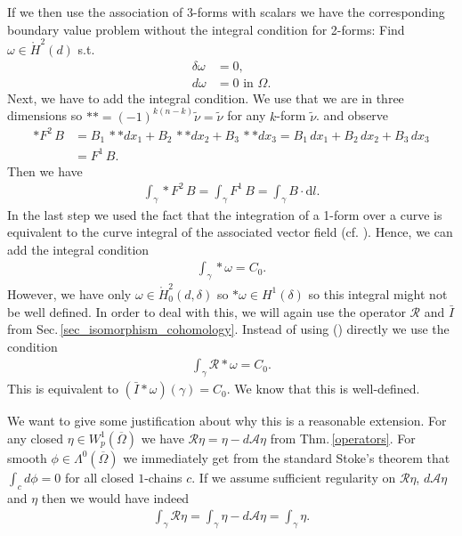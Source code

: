 \documentclass[12pt,a4paper]{article}
\theoremstyle{definition}
\newcommand{\aop}{\mathscr{A}}
\newcommand{\omegabar}{\overline{\Omega}}
\newcommand{\rop}{\mathscr{R}} %
\begin{document}
If we then use the association of
3-forms with scalars we have the corresponding boundary value problem without
the integral condition for 
2-forms: Find $\omega \in \mathring{H}^2(d)$ s.t.
\begin{align}
    \delta \omega &= 0, \\ 
    d\omega  &= 0 \text{ in } \Omega.
\end{align}
Next, we have to add the integral condition. 
We use that we are in three dimensions so
$**=(-1)^{k(n-k)}\tilde{\nu} = \tilde{\nu}$ \cite[p.66]{arnold} for any
$k$-form $\tilde{\nu}$.
and observe
\begin{align*}
    *F^2 \, B  &= B_1 \, **dx_1 + B_2 \, **dx_2 + B_3\, **dx_3 
        = B_1 \, dx_1 + B_2 \, dx_2 + B_3\, dx_3\\ 
    &= F^1 \, B.
\end{align*}
Then we have 
\begin{align*}
    \int_\gamma * F^2\, B = \int_\gamma F   ^1\, B = \int_\gamma B \cdot \text{d}l.
\end{align*}
In the last step we used the fact that the integration of a 1-form over a
curve is equivalent to the curve integral of the associated vector field
(cf. \cite[Sec. 6.2.3]{arnold}). Hence, we can add the integral condition 
\begin{align}
    \int_\gamma *\omega = C_0 \label{integral_condition}.
\end{align}
However, we have  only $\omega \in \mathring{H}_0^2(d,\delta)$ so 
$*\omega \in H^1(\delta)$ so this integral might not be well defined. In order 
to deal with this, we will again use the operator $\rop$ and $\bar{I}$ from 
Sec.\,\ref{sec_isomorphism_cohomology}. Instead of using 
() directly we use the condition 
\begin{align*}
    \int_\gamma \rop * \omega = C_0.
\end{align*}
This is equivalent to $(\bar{I}*\omega)(\gamma) = C_0$. We know that this is 
well-defined. 


We want to give some justification about why this is a reasonable extension.
For any closed $\eta \in W^1_p(\omegabar)$ we have $\rop \eta = \eta - 
d\aop\eta$ from Thm.\,\ref{operators}. For smooth 
$\phi \in \Lambda^0(\omegabar)$ we immediately get from the standard Stoke's 
theorem that $\int_c d\phi = 0$ for all closed $1$-chains $c$. If we 
assume sufficient regularity on $\rop \eta$, $d\aop\eta$ and $\eta$ 
then we would have indeed 
\begin{align*}
    \int_\gamma \rop \eta = \int_\gamma \eta - d\aop\eta = \int_\gamma \eta.
\end{align*}
\end{document}
